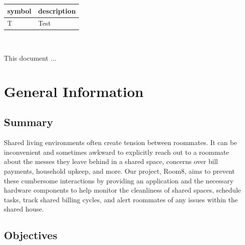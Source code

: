 \documentclass[12pt, titlepage]{article}
\begin{document}
\renewcommand{\arraystretch}{1.2}
\begin{tabular}{l l} 
  \toprule		
  \textbf{symbol} & \textbf{description}\\
  \midrule 
  T & Test\\
  \bottomrule
\end{tabular}\\



\newpage


This document ... 

\section{General Information}

\subsection{Summary}

  
Shared living environments often create tension between roommates. It can be inconvenient and sometimes awkward to explicitly reach out to a roommate about the messes they leave behind in a shared space, concerns over bill payments, household upkeep, and more. Our project, Room8,
aims to prevent these cumbersome interactions by providing an application and the
necessary hardware components to help monitor the cleanliness of shared spaces,
schedule tasks, track shared billing cycles, and alert roommates of any issues within the shared house.

\subsection{Objectives}

\end{document}

